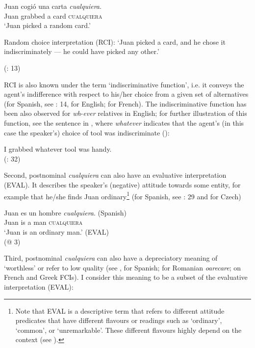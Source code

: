 \ea \label{ex:key:6}
    \gll Juan cogió  una  carta  \textit{cualquiera}.\\
    Juan grabbed  a  card  \textsc{cualquiera}\\
    \glt ‘Juan picked a random card.’
    
    Random choice interpretation (RCI): ‘Juan picked a card, and he chose it indiscriminately — he could have picked any other.’
    
    (\citealt{am2018}: 13)
\z

RCI is also known under the term ‘indiscriminative function’, i.e. it conveys the agent’s indifference with respect to his/her choice from a given set of alternatives (for Spanish, see \citealt{am2015}: 14, \citealt{Horn2000} for English; \citealt{Vlachou2007,Vlachou2012} for French). The indiscriminative function has been also observed for \textit{wh}{}-\textit{ever} relatives in English; for further illustration of this function, see the sentence in , where \textit{whatever} indicates that the agent’s (in this case the speaker’s) choice of tool was indiscriminate (\citealt{Fintel2000}):

\ea \label{ex:key:7}
    I grabbed whatever tool was handy.\\
      (\citealt{Fintel2000}: 32)
\z

Second, postnominal \textit{cualquiera} can also have an evaluative interpretation (EVAL). It describes the speaker’s (negative) attitude towards some entity, for example that he/she finds Juan ordinary\footnote{{Note that EVAL is a descriptive term that refers to different attitude predicates that have different flavours or readings such as ‘ordinary’, ‘common’, or ‘unremarkable’. These different flavours highly depend on the context (see ).}} (for Spanish, see \citealt{Alonso-OvalleMenéndez-Benito2011}: 29 and  \citealt{Simik2008} for Czech)

\ea \label{ex:key:8}
    \gll Juan es un hombre \textit{cualquiera}. (Spanish)\\
    Juan is a man \textsc{cualquiera}\\
    \glt ‘Juan is an ordinary man.’ (EVAL)\\
    (@ 3)
\z

Third, postnominal \textit{cualquiera} can also have a depreciatory meaning of ‘worthless’ or refer to low quality (see \citealt{Rivero2011}, \citealt{Alonso-OvalleMenéndez-Benito2011} for Spanish; \citealt{Fălăuş2015} for Romanian \textit{oarecare}; \citealt{Vlachou2007,Vlachou2012} on French and Greek FCIs). I consider this meaning to be a subset of the evaluative interpretation (EVAL):

